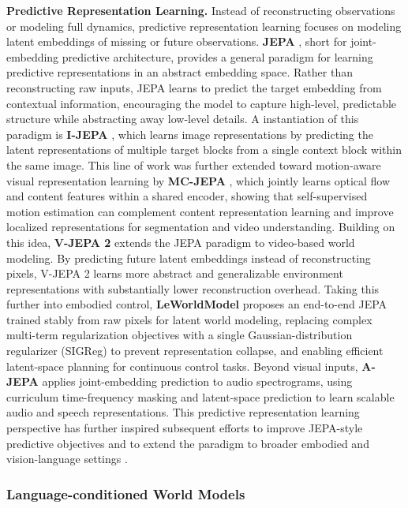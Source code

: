 \textbf{Predictive Representation Learning.}
Instead of reconstructing observations or modeling full dynamics, predictive representation learning focuses on modeling latent embeddings of missing or future observations. \textbf{JEPA} \cite{JEPA}, short for joint-embedding predictive architecture, provides a general paradigm for learning predictive representations in an abstract embedding space. Rather than reconstructing raw inputs, JEPA learns to predict the target embedding from contextual information, encouraging the model to capture high-level, predictable structure while abstracting away low-level details. A instantiation of this paradigm is \textbf{I-JEPA} \cite{I-JEPA}, which learns image representations by predicting the latent representations of multiple target blocks from a single context block within the same image. This line of work was further extended toward motion-aware visual representation learning by \textbf{MC-JEPA} \cite{MC-JEPA}, which jointly learns optical flow and content features within a shared encoder, showing that self-supervised motion estimation can complement content representation learning and improve localized representations for segmentation and video understanding. Building on this idea, \textbf{V-JEPA 2} \cite{V-JEPA-2} extends the JEPA paradigm to video-based world modeling. By predicting future latent embeddings instead of reconstructing pixels, V-JEPA 2 learns more abstract and generalizable environment representations with substantially lower reconstruction overhead. Taking this further into embodied control, \textbf{LeWorldModel} \cite{maes2026leworldmodelstableendtoendjointembedding} proposes an end-to-end JEPA trained stably from raw pixels for latent world modeling, replacing complex multi-term regularization objectives with a single Gaussian-distribution regularizer (SIGReg) to prevent representation collapse, and enabling efficient latent-space planning for continuous control tasks. Beyond visual inputs, \textbf{A-JEPA} \cite{A-JEPA} applies joint-embedding prediction to audio spectrograms, using curriculum time-frequency masking and latent-space prediction to learn scalable audio and speech representations. This predictive representation learning perspective has further inspired subsequent efforts to improve JEPA-style predictive objectives \cite{Rethinking_JEPA, V-JEPA-2.1} and to extend the paradigm to broader embodied and vision-language settings \cite{Drive-JEPA, JEPA-VLA, VLA-JEPA, VL-JEPA}.

\subsubsection{Language-conditioned World Models}
\label{Language-conditioned and Multimodal}

